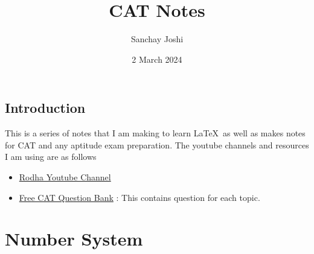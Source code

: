 \documentclass{book}
\title{CAT Notes}
\author{Sanchay Joshi}
\date{2 March 2024}
\begin{document}
\maketitle
\tableofcontents
\newpage



\chapter*{Introduction}
This is a series of notes that I am making to learn \LaTeX \, as well as makes notes for CAT and any aptitude exam preparation. The youtube channels and resources I am using are as follows

\begin{itemize}
    \item \href{https://www.youtube.com/@Rodha/playlists}{Rodha Youtube Channel}
    \item \href{https://iim-cat-questions-answers.2iim.com/}{Free CAT Question Bank} : This contains question for each topic. 
\end{itemize}

\part{Number System}


% 

% 

% 

% 
\end{document}
